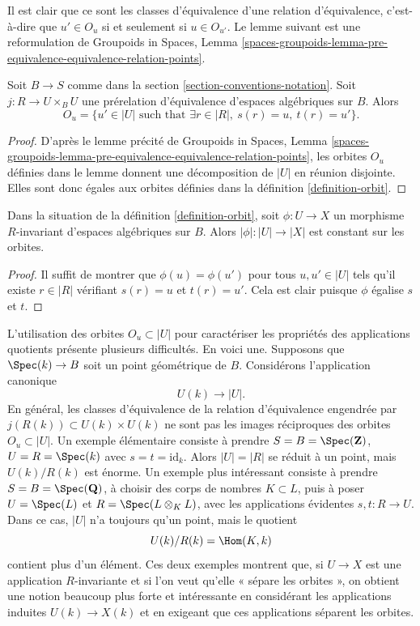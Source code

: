 \noindent
Il est clair que ce sont les classes d'équivalence d'une relation d'équivalence,
c'est-à-dire que $u' \in O_u$ si et seulement si $u \in O_{u'}$. Le lemme suivant
est une reformulation de
Groupoids in Spaces,
Lemma \ref{spaces-groupoids-lemma-pre-equivalence-equivalence-relation-points}.

\begin{lemma}
\label{lemma-pre-equivalence-equivalence-relation-points}
Soit $B \to S$ comme dans la section \ref{section-conventions-notation}.
Soit $j : R \to U \times_B U$ une prérelation d'équivalence
d'espaces algébriques sur $B$. Alors
$$
O_u =
\{u' \in |U| \text{ such that } \exists r \in |R|, \ s(r) = u, \ t(r) = u'\}.
$$
\end{lemma}

\begin{proof}
D'après le lemme précité de
Groupoids in Spaces,
Lemma \ref{spaces-groupoids-lemma-pre-equivalence-equivalence-relation-points},
les orbites $O_u$ définies dans le lemme donnent une décomposition de
$|U|$ en réunion disjointe. Elles sont donc égales aux
orbites définies dans la définition \ref{definition-orbit}.
\end{proof}

\begin{lemma}
\label{lemma-invariant-map-constant-on-orbit}
Dans la situation de la définition \ref{definition-orbit},
soit $\phi : U \to X$ un morphisme $R$-invariant d'espaces algébriques sur
$B$. Alors $|\phi| : |U| \to |X|$ est constant sur les orbites.
\end{lemma}

\begin{proof}
Il suffit de montrer que $\phi(u) = \phi(u')$
pour tous $u, u' \in |U|$ tels qu'il existe
$r \in |R|$ vérifiant $s(r) = u$ et $t(r) = u'$.
Cela est clair puisque $\phi$ égalise $s$ et $t$.
\end{proof}

\noindent
L'utilisation des orbites $O_u \subset |U|$ pour caractériser les propriétés
des applications quotients présente plusieurs difficultés. En voici une.
Supposons que $\Spec(k) \to B$
soit un point géométrique de $B$. Considérons l'application canonique
$$
U(k) \longrightarrow |U|.
$$
En général, les classes d'équivalence
de la relation d'équivalence engendrée par $j(R(k)) \subset U(k) \times U(k)$
ne sont pas les images réciproques des orbites $O_u \subset |U|$.
Un exemple élémentaire consiste à prendre $S = B = \Spec(\mathbf{Z})$,
$U = R = \Spec(k)$ avec $s = t = \text{id}_k$. Alors $|U| = |R|$ se réduit
à un point, mais $U(k)/R(k)$ est énorme.
Un exemple plus intéressant consiste à prendre $S = B = \Spec(\mathbf{Q})$,
à choisir des corps de nombres $K \subset L$, puis à poser $U = \Spec(L)$
et $R = \Spec(L \otimes_K L)$, avec les applications évidentes $s, t : R \to U$.
Dans ce cas, $|U|$ n'a toujours qu'un point, mais le quotient
$$
U(k)/R(k) = \Hom(K, k)
$$
contient plus d'un élément. Ces deux exemples montrent
que, si $U \to X$ est une application $R$-invariante et si l'on veut qu'elle
« sépare les orbites », on obtient une notion beaucoup plus forte et intéressante en
considérant les applications induites $U(k) \to X(k)$ et en exigeant que
ces applications séparent les orbites.

